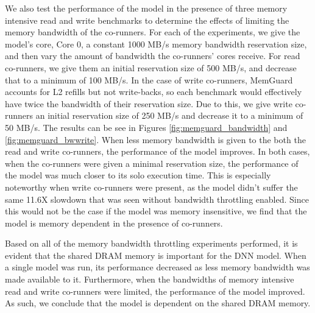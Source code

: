 We also test the performance of the model in the presence of three
memory intensive read and write benchmarks to determine the effects of 
limiting the memory bandwidth of the co-runners. For each of the 
experiments, we give the model's core, Core 0, a constant 1000 MB/s 
memory bandwidth reservation size, and then vary the amount of bandwidth 
the co-runners' cores receive. For read co-runners, we give them an initial
reservation size of 500 MB/s, and decrease that to a minimum of 100 MB/s.
In the case of write co-runners, MemGuard accounts for L2 refills but not
write-backs, so each benchmark would effectively have twice the bandwidth
of their reservation size. Due to this, we give write co-runners an initial 
reservation size of 250 MB/s and decrease it to a minimum of 50 MB/s.
The results can be see in Figures \ref{fig:memguard_bandwidth} and
\ref{fig:memguard_bwwrite}. When less memory bandwidth is given to 
the both the  read and write co-runners, the performance of the model 
improves. 
In both cases, when the co-runners were given a minimal reservation size,
the performance of the model was much closer to its solo execution time.
This is especially noteworthy when write co-runners were present, as the 
model didn't suffer the same 11.6X slowdown that was seen without
bandwidth throttling enabled. 
Since this would not be the case if the 
model was memory insensitive, we find that the model is memory 
dependent in the presence of co-runners.

Based on all of the memory bandwidth throttling experiments 
performed, it is evident that the shared DRAM memory is important for
the DNN model. When a single model was run, its 
performance decreased as less memory bandwidth was 
made available to it. Furthermore, when the bandwidths of memory 
intensive read and write co-runners were limited, the performance of 
the model improved. As such, we conclude that the model is dependent on the 
shared DRAM memory.